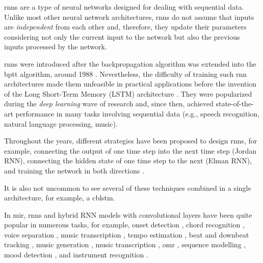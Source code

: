 

\glspl{rnn} are a type of neural networks designed for
dealing with sequential data. Unlike most other neural
network architectures, \glspl{rnn} do not assume that inputs
are \emph{independent} from each other and, therefore, they
update their parameters considering not only the current
input to the network but also the previous inputs processed
by the network.

\glspl{rnn} were introduced after the backpropagation
algorithm \parencite{rumelhart1988learning} was extended
into the \gls{bptt} algorithm, around 1988
\parencite{werbos1988generalization,
werbos1990backpropagation}. Nevertheless, the difficulty of
training such \gls{rnn} architectures made them unfeasible
in practical applications before the invention of the Long
Short-Term Memory (LSTM) architecture
\parencite{hochreiter1997long}. They were popularized during
the \emph{deep learning} wave of research and, since then,
achieved state-of-the-art performance in many tasks
involving sequential data (e.g., speech recognition, natural
language processing, music).

Throughout the years, different strategies have been
proposed to design \glspl{rnn}, for example, connecting the
output of one time step into the next time step (Jordan
RNN), connecting the hidden state of one time step to the
next (Elman RNN), and training the network in both
directions \parencite{schuster1997bidirectional}.

It is also not uncommon to see several of these techniques
combined in a single architecture, for example, a
\gls{cblstm}.

In \gls{mir}, \glspl{rnn} and hybrid RNN models with
convolutional layers have been quite popular in numerous
tasks, for example, onset detection
\parencite{eyben2010universal}, chord recognition
\parencite{boulangerlewandowski2013audio, sigtia2016endend,
sears2018evaluating}, voice separation
\parencite{huang2014singingvoice}, music transcription
\parencite{sigtia2014rnnbased}, tempo estimation
\parencite{bock2015accurate}, beat and downbeat tracking
\parencite{bock2016joint, krebs2016downbeat}, music
generation \parencite{liu2016predicting, liang2017automatic,
lim2017chord}, music transcription
\parencite{rigaud2016singing, sigtia2016endend,
southall2016automatic, vogl2016recurrent,
southall2017automatic, vogl2017drum, basaran2018main},
\gls{omr} \parencite{calvozaragoza2017onestep,
wel2017optical, calvozaragoza2018cameraprimus}, sequence
modelling \parencite{ycart2017study}, mood detection
\parencite{delbouys2018music}, and instrument recognition
\parencite{gururani2018instrument}.



